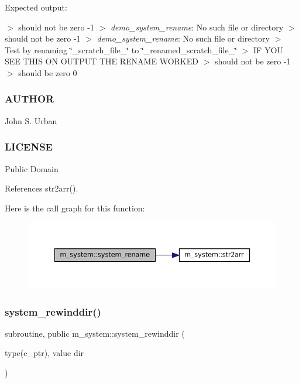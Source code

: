 Expected output\+:

$>$ should not be zero -\/1 $>$ {\itshape demo\+\_\+system\+\_\+rename}\+: No such file or directory $>$ should not be zero -\/1 $>$ {\itshape demo\+\_\+system\+\_\+rename}\+: No such file or directory $>$ Test by renaming \char`\"{}\+\_\+scratch\+\_\+file\+\_\+\char`\"{} to \char`\"{}\+\_\+renamed\+\_\+scratch\+\_\+file\+\_\+\char`\"{} $>$ IF Y\+OU S\+EE T\+H\+IS ON O\+U\+T\+P\+UT T\+HE R\+E\+N\+A\+ME W\+O\+R\+K\+ED $>$ should not be zero -\/1 $>$ should be zero 0

\subsubsection*{A\+U\+T\+H\+OR}

John S. Urban \subsubsection*{L\+I\+C\+E\+N\+SE}

Public Domain 

References str2arr().

Here is the call graph for this function\+:
\nopagebreak
\begin{figure}[H]
\begin{center}
\leavevmode
\includegraphics[width=350pt]{namespacem__system_adfbaf3d17790da9ba0c520683d5b8003_cgraph}
\end{center}
\end{figure}
\mbox{\label{namespacem__system_a3ffe757195ade8052e8acabd196ee3ca}} 
\subsubsection{\texorpdfstring{system\+\_\+rewinddir()}{system\_rewinddir()}}
{\footnotesize\ttfamily subroutine, public m\+\_\+system\+::system\+\_\+rewinddir (\begin{DoxyParamCaption}\item[{type(c\+\_\+ptr), value}]{dir }\end{DoxyParamCaption})}



